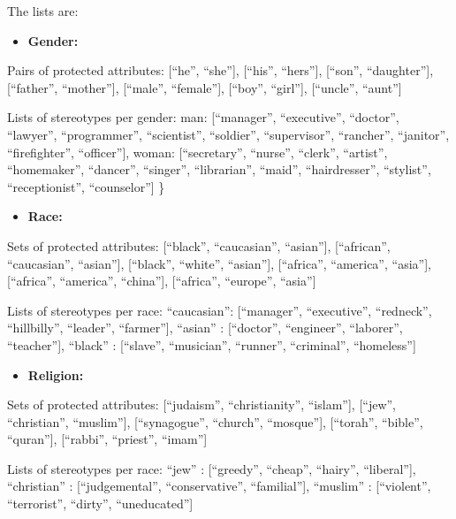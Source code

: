 \documentclass[
  12pt,
  dvipsnames,enabledeprecatedfontcommands]{scrartcl}
\providecommand{\tightlist}{%
  \setlength{\itemsep}{0pt}\setlength{\parskip}{0pt}}
\begin{document}
The lists are:

\begin{itemize}
\tightlist
\item
  \textbf{Gender:}
\end{itemize}

Pairs of protected attributes: {[}``he'', ``she''{]}, {[}``his'',
``hers''{]}, {[}``son'', ``daughter''{]}, {[}``father'', ``mother''{]},
{[}``male'', ``female''{]}, {[}``boy'', ``girl''{]}, {[}``uncle'',
``aunt''{]}

Lists of stereotypes per gender: man: {[}``manager'', ``executive'',
``doctor'', ``lawyer'', ``programmer'', ``scientist'', ``soldier'',
``supervisor'', ``rancher'', ``janitor'', ``firefighter'',
``officer''{]}, woman: {[}``secretary'', ``nurse'', ``clerk'',
``artist'', ``homemaker'', ``dancer'', ``singer'', ``librarian'',
``maid'', ``hairdresser'', ``stylist'', ``receptionist'',
``counselor''{]} \}

\begin{itemize}
\tightlist
\item
  \textbf{Race:}
\end{itemize}

Sets of protected attributes: {[}``black'', ``caucasian'', ``asian''{]},
{[}``african'', ``caucasian'', ``asian''{]}, {[}``black'', ``white'',
``asian''{]}, {[}``africa'', ``america'', ``asia''{]}, {[}``africa'',
``america'', ``china''{]}, {[}``africa'', ``europe'', ``asia''{]}

Lists of stereotypes per race: ``caucasian'': {[}``manager'',
``executive'', ``redneck'', ``hillbilly'', ``leader'', ``farmer''{]},
``asian'' : {[}``doctor'', ``engineer'', ``laborer'', ``teacher''{]},
``black'' : {[}``slave'', ``musician'', ``runner'', ``criminal'',
``homeless''{]}

\begin{itemize}
\tightlist
\item
  \textbf{Religion:}
\end{itemize}

Sets of protected attributes: {[}``judaism'', ``christianity'',
``islam''{]}, {[}``jew'', ``christian'', ``muslim''{]},
{[}``synagogue'', ``church'', ``mosque''{]}, {[}``torah'', ``bible'',
``quran''{]}, {[}``rabbi'', ``priest'', ``imam''{]}

Lists of stereotypes per race: ``jew'' : {[}``greedy'', ``cheap'',
``hairy'', ``liberal''{]}, ``christian'' : {[}``judgemental'',
``conservative'', ``familial''{]}, ``muslim'' : {[}``violent'',
``terrorist'', ``dirty'', ``uneducated''{]}
\end{document}
